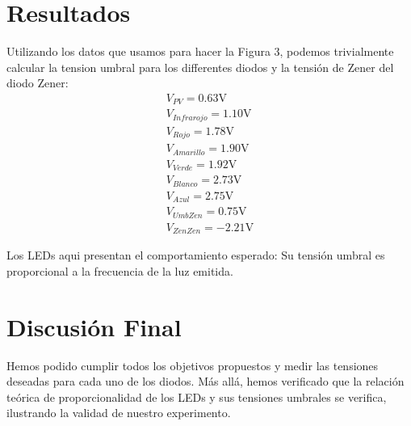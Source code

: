 \documentclass[a4paper,12pt]{article}
\begin{document}
\section{Resultados}
Utilizando los datos que usamos para hacer la Figura 3, podemos trivialmente calcular la tension umbral para los differentes diodos y la tensión de Zener del diodo Zener:
\begin{gather*}
	V_{PV} = 0.63 \text{V}\\
	V_{Infrarojo} = 1.10 \text{V} \\
	V_{Rojo} = 1.78 \text{V} \\
	V_{Amarillo} = 1.90 \text{V} \\
	V_{Verde} = 1.92 \text{V}\\
	V_{Blanco} = 2.73 \text{V} \\
	V_{Azul} = 2.75 \text{V}\\ 
	V_{UmbZen} = 0.75 \text{V}\\
	V_{ZenZen} = -2.21\text{V}
\end{gather*}

Los LEDs aqui presentan el comportamiento esperado: Su tensión umbral es proporcional a la frecuencia de la luz emitida.

\section{Discusión Final}
Hemos podido cumplir todos los objetivos propuestos y medir las tensiones deseadas para cada uno de los diodos. Más allá, hemos verificado que la relación teórica de proporcionalidad de los LEDs y sus tensiones umbrales se verifica, ilustrando la validad de nuestro experimento.
\end{document}
